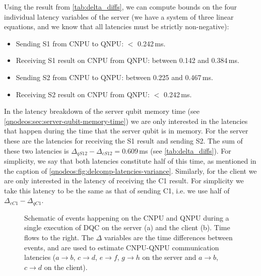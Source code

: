 Using the result from \cref{tab:delta_diffs}, we can compute bounds on the four individual latency variables of the server (we have a system of three linear equations, and we know that all latencies must be strictly non-negative):
%
\begin{itemize}
    \item Sending S1 from \ac{CNPU} to \ac{QNPU}: $<$ 0.242\,ms.
    \item Receiving S1 result on \ac{CNPU} from \ac{QNPU}: between 0.142 and 0.384\,ms.
    \item Sending S2 from \ac{CNPU} to \ac{QNPU}: between 0.225 and 0.467\,ms.
    \item Receiving S2 result on \ac{CNPU} from QNPU: $<$ 0.242\,ms.
\end{itemize}

In the latency breakdown of the server qubit memory time (see \cref{qnodeos:sec:server-qubit-memory-time}) we are only interested in the latencies that happen during the time that the server qubit is in memory. For the server these are the latencies for receiving the S1 result and sending S2. The sum of these two latencies is $\Delta_{qS12} - \Delta_{cS12} = 0.609$\,ms (see \cref{tab:delta_diffs}). For simplicity, we say that both latencies constitute half of this time, as mentioned in the caption of \cref{qnodeos:fig:delcomp-latencies-variance}. Similarly, for the client we are only interested in the latency of receiving the C1 result. For simplicity we take this latency to be the same as that of sending C1, i.e. we use half of $\Delta_{cC1} - \Delta_{qC1}$.

\begin{figure}[t]
    \centering
    \hfill
    \caption{Schematic of events happening on the \ac{CNPU} and \ac{QNPU} during a single execution of \ac{DQC} on the server (a) and the client (b). Time flows to the right. The $\Delta$ variables are the time differences between events, and are used to estimate \ac{CNPU}-\ac{QNPU} communication latencies ($a\rightarrow b$, $c\rightarrow d$, $e\rightarrow f$, $g\rightarrow h$ on the server and $a\rightarrow b$, $c\rightarrow d$ on the client).}
    \label{qnodeos:fig:cnpu_qnpu_latencies}%
\end{figure}

